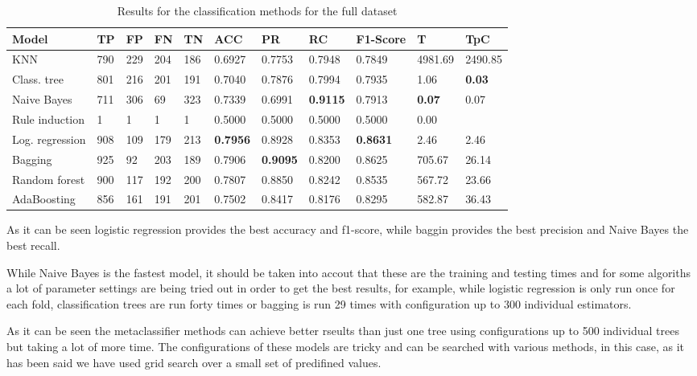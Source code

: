 \documentclass[a4paper,11pt]{article}
\begin{document}
\begin{table}
\centering

\begin{tabular}{|l|l|l|l|l|l|l|l|l|l|l|}
\hline

\textbf{Model} & \textbf{TP} & \textbf{FP} & \textbf{FN} & \textbf{TN} & \textbf{ACC} & \textbf{PR} & \textbf{RC} & \textbf{F1-Score} & \textbf{T} & \textbf{TpC} \\ \hline
KNN & 790 & 229 & 204 & 186 & 0.6927 & 0.7753 & 0.7948 & 0.7849 & 4981.69 & 2490.85 \\ \hline
Class. tree & 801 & 216 & 201 & 191 & 0.7040 & 0.7876 & 0.7994 & 0.7935 & 1.06 & \textbf{0.03} \\ \hline
Naive Bayes & 711 & 306 & 69 & 323 & 0.7339 & 0.6991 & \textbf{0.9115} & 0.7913 & \textbf{0.07} & 0.07 \\ \hline
Rule induction & 1 & 1 & 1 & 1 & 0.5000 & 0.5000 & 0.5000 & 0.5000 & 0.00 \\ \hline
Log. regression & 908 & 109 & 179 & 213 & \textbf{0.7956} & 0.8928 & 0.8353 & \textbf{0.8631} & 2.46 & 2.46 \\ \hline
Bagging & 925 & 92 & 203 & 189 & 0.7906 & \textbf{0.9095} & 0.8200 & 0.8625 & 705.67 & 26.14 \\ \hline
Random forest & 900 & 117 & 192 & 200 & 0.7807 & 0.8850 & 0.8242 & 0.8535 & 567.72 & 23.66 \\ \hline
AdaBoosting & 856 & 161 & 191 & 201 & 0.7502 & 0.8417 & 0.8176 & 0.8295 & 582.87 & 36.43 \\ \hline

\end{tabular}
\caption{Results for the classification methods for the full dataset}
\label{class:full}
\end{table}

As it can be seen logistic regression provides the best accuracy and f1-score, while baggin provides the best precision and Naive Bayes the best recall. 

While Naive Bayes is the fastest model, it should be taken into accout that these are the training and testing times and for some algoriths a lot of parameter settings are being tried out in order to get the best results, for example, while logistic regression is only run once for each fold, classification trees are run forty times or bagging is run 29 times with configuration up to 300 individual estimators.

As it can be seen the metaclassifier methods can achieve better rseults than just one tree using configurations up to 500 individual trees but taking a lot of more time. The configurations of these models are tricky and can be searched with various methods, in this case, as it has been said we have used grid search over a small set of predifined values.
\end{document}
